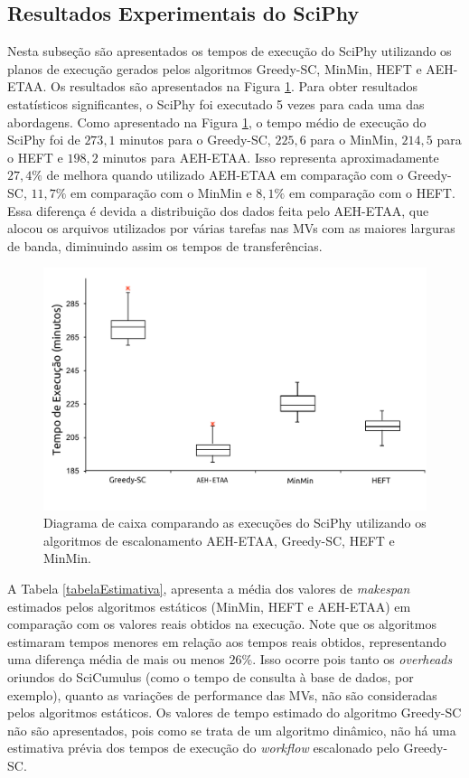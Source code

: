\subsection{Resultados Experimentais do SciPhy}

Nesta subseção são apresentados os tempos de execução do SciPhy utilizando os planos de execução gerados pelos algoritmos Greedy-SC, MinMin, HEFT e AEH-ETAA. Os resultados são apresentados na Figura \ref{fig:boxplot}. Para obter resultados estatísticos significantes, o SciPhy foi executado 5 vezes para cada uma das abordagens. Como apresentado na Figura \ref{fig:boxplot}, o tempo médio de execução do SciPhy foi de $273,1$ minutos para o Greedy-SC, $225,6$ para o MinMin, $214,5$ para o HEFT e $198,2$ minutos para AEH-ETAA. Isso representa aproximadamente $27,4\%$ de melhora quando utilizado AEH-ETAA em comparação com o Greedy-SC, $11,7\%$ em comparação com o MinMin e $8,1\%$ em comparação com o HEFT. Essa diferença é devida a distribuição dos dados feita pelo AEH-ETAA, que alocou os arquivos utilizados por várias tarefas nas MVs com as maiores larguras de banda, diminuindo  assim os tempos de transferências. 

\begin{figure}[H]
\centering
\includegraphics[width=.8\linewidth]{figure/Graphic_FGCS.pdf}
\caption{Diagrama de caixa comparando as execuções do SciPhy utilizando os algoritmos de escalonamento AEH-ETAA, Greedy-SC, HEFT e MinMin.}
\label{fig:boxplot}
\end{figure}



A Tabela \ref{tabelaEstimativa}, apresenta a média dos valores de \textit{makespan} estimados pelos algoritmos estáticos (MinMin, HEFT e AEH-ETAA) em comparação com os valores reais obtidos na execução. Note que os algoritmos estimaram tempos menores em relação aos tempos reais obtidos, representando uma diferença média de mais ou menos $26\%$. Isso ocorre pois tanto os \textit{overheads} oriundos do SciCumulus (como o tempo de consulta à base de dados, por exemplo), quanto as variações de performance das MVs, não são consideradas pelos algoritmos estáticos. Os valores de tempo estimado do algoritmo Greedy-SC não são apresentados, pois como se trata de um algoritmo dinâmico, não há uma estimativa prévia dos tempos de execução do \textit{workflow} escalonado pelo Greedy-SC.


